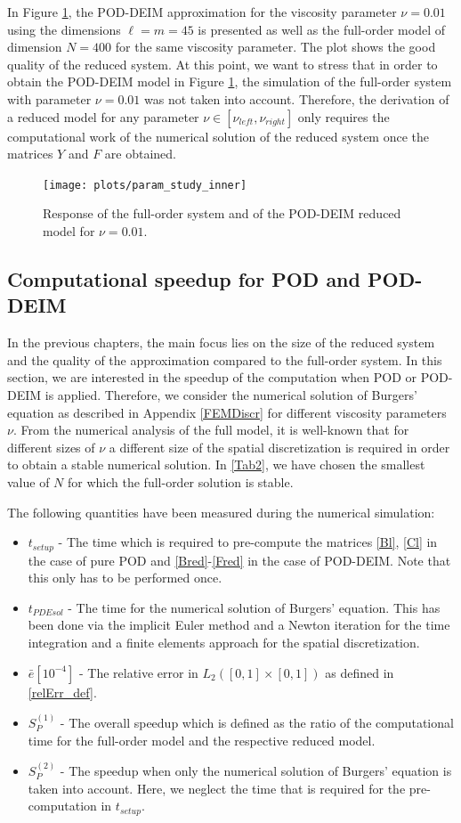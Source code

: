 In Figure \ref{param_study_inner}, the POD-DEIM approximation for the viscosity parameter $\nu = 0.01$ using the dimensions $\ell = m = 45$ is presented as well as the full-order model of dimension $N = 400$ for the same viscosity parameter. The plot shows the good quality of the reduced system. At this point, we want to stress that in order to obtain the POD-DEIM model in Figure \ref{param_study_inner}, the simulation of the full-order system with parameter $\nu = 0.01$  was not taken into account. Therefore, the derivation of a reduced model for any parameter $\nu \in [\nu_{left}, \nu_{right}]$ only requires the computational work of the numerical solution of the reduced system once the matrices $Y$ and $F$ are obtained.
\begin{figure}[H]
\texttt{[image: plots/param\_study\_inner]}
\caption{Response of the full-order system and of the POD-DEIM reduced model for $\nu=0.01$.}\label{param_study_inner}
\end{figure}
\subsection{Computational speedup for POD and POD-DEIM}
\label{sect2_numTests}
In the previous chapters, the main focus lies on the size of the reduced system and the quality of the approximation compared to the full-order system. In this section, we are interested in the speedup of the computation when POD or POD-DEIM is applied. Therefore, we consider the numerical solution of Burgers' equation as described in Appendix \ref{FEMDiscr} for different viscosity parameters $\nu$. From the numerical analysis of the full model, it is well-known that for different sizes of $\nu$ a different size of the spatial discretization is required in order to obtain a stable numerical solution. In \ref{Tab2}, we have chosen the smallest value of $N$ for which the full-order solution is stable.

The following quantities have been measured during the numerical simulation:
\begin{itemize}
  \item $t_{setup}$ - The time which is required to pre-compute the matrices \eqref{Bl}, \eqref{Cl} in the case of pure POD and \eqref{Bred}-\eqref{Fred} in the case of POD-DEIM. Note that this only has to be performed once.
  \item $t_{PDEsol}$  - The time for the numerical solution of Burgers' equation. This has been done via the implicit Euler method and a Newton iteration for the time integration and a finite elements approach for the spatial discretization.
  \item $\bar{e}[10^{-4}]$  - The relative error in $L_2([0,1] \times [0,1])$ as defined in \eqref{relErr_def}.
  \item $S_P^{(1)}$  - The overall speedup which is defined as the ratio of the computational time for the full-order model and the respective reduced model.
  \item $S_P^{(2)}$ - The speedup when only the numerical solution of Burgers' equation is taken into account. Here, we neglect the time that is required for the pre-computation in $t_{setup}$.
\end{itemize}

